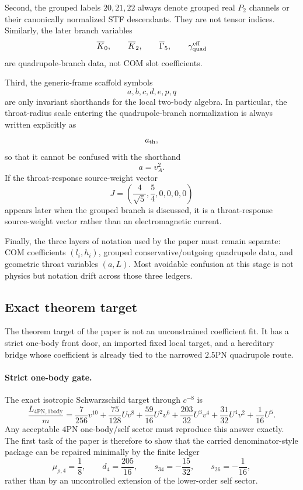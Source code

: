 \documentclass[11pt]{article}
\begin{document}
Second, the grouped labels $20,21,22$ always denote grouped real $P_2$
channels or their canonically normalized STF descendants.  They are not tensor
indices.  Similarly, the later branch variables
\[
\overline K_0,
\qquad
\overline K_2,
\qquad
\overline\Gamma_5,
\qquad
\gamma_{\rm quad}^{\rm eff}
\]
are quadrupole-branch data, not COM slot coefficients.

Third, the generic-frame scaffold symbols
\[
a,b,c,d,e,p,q
\]
are only invariant shorthands for the local two-body algebra.  In particular,
the throat-radius scale entering the quadrupole-branch normalization is always
written explicitly as
\[
a_{\rm th},
\]
so that it cannot be confused with the shorthand
\[
a=v_A^2.
\]
If the throat-response source-weight vector
\[
J=\left(\frac{4}{\sqrt5},\frac54,0,0,0,0\right)
\]
appears later when the grouped branch is discussed, it is a throat-response
source-weight vector rather than an electromagnetic current.

Finally, the three layers of notation used by the paper must remain separate:
COM coefficients $(l_i,h_i)$, grouped conservative/outgoing quadrupole data,
and geometric throat variables $(a,L)$.  Most avoidable confusion at this stage
is not physics but notation drift across those three ledgers.

\subsection{Exact theorem target}
\label{sec:dictionary-theorem-target}

The theorem target of the paper is not an unconstrained coefficient fit.  It has
a strict one-body front door, an imported fixed local target, and a hereditary
bridge whose coefficient is already tied to the narrowed $2.5$PN quadrupole
route.

\paragraph{Strict one-body gate.}
The exact isotropic Schwarzschild target through $c^{-8}$ is
\[
\frac{L_{4\mathrm{PN},1\mathrm{body}}}{m}
=
\frac7{256}v^{{10}}
+\frac{75}{128}Uv^8
+\frac{59}{16}U^2v^6
+\frac{203}{32}U^3v^4
+\frac{31}{32}U^4v^2
+\frac1{16}U^5.
\]
Any acceptable $4$PN one-body/self sector must reproduce this answer exactly.
The first task of the paper is therefore to show that the carried denominator-style
package can be repaired minimally by the finite ledger
\[
\mu_{\rho,4}=\frac18,
\qquad
 d_4=\frac{205}{16},
\qquad
 s_{34}=-\frac{15}{32},
\qquad
 s_{26}=-\frac1{16},
\]
rather than by an uncontrolled extension of the lower-order self sector.
\end{document}
